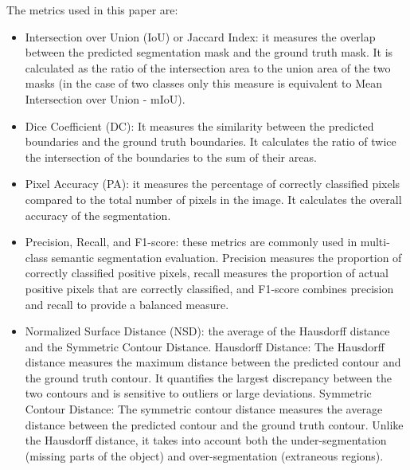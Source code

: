 \documentclass[runningheads]{llncs}
\begin{document}
The metrics used in this paper are:
\begin{itemize}
\item Intersection over Union (IoU) or Jaccard Index: it measures the overlap between the predicted segmentation mask and the ground truth mask. It is calculated as the ratio of the intersection area to the union area of the two masks (in the case of two classes only this measure is equivalent to Mean Intersection over Union - mIoU).
\item Dice Coefficient (DC): It measures the similarity between the predicted boundaries and the ground truth boundaries. It calculates the ratio of twice the intersection of the boundaries to the sum of their areas.
\item Pixel Accuracy (PA): it measures the percentage of correctly classified pixels compared to the total number of pixels in the image. It calculates the overall accuracy of the segmentation.
\item Precision, Recall, and F1-score: these metrics are commonly used in multi-class semantic segmentation evaluation. Precision measures the proportion of correctly classified positive pixels, recall measures the proportion of actual positive pixels that are correctly classified, and F1-score combines precision and recall to provide a balanced measure.
\item Normalized Surface Distance (NSD): the average of the Hausdorff distance and the Symmetric Contour Distance. Hausdorff Distance: The Hausdorff distance measures the maximum distance between the predicted contour and the ground truth contour. It quantifies the largest discrepancy between the two contours and is sensitive to outliers or large deviations. Symmetric Contour Distance: The symmetric contour distance measures the average distance between the predicted contour and the ground truth contour. Unlike the Hausdorff distance, it takes into account both the under-segmentation (missing parts of the object) and over-segmentation (extraneous regions).
\end{itemize}
\end{document}
